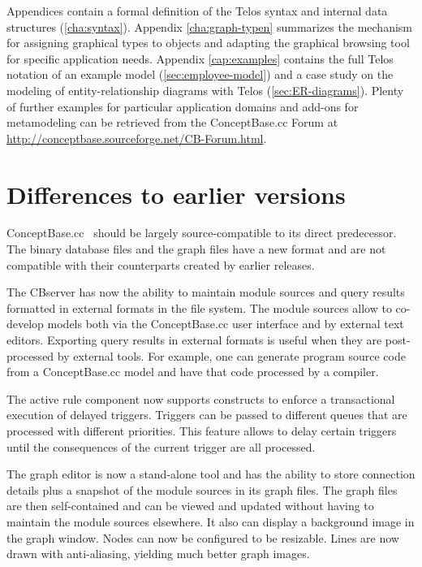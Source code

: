 Appendices contain a formal definition of the Telos syntax and internal data
structures (\ref{cha:syntax}). Appendix \ref{cha:graph-typen} summarizes
the mechanism for assigning graphical types to objects and adapting
the graphical browsing tool for specific application needs. Appendix
\ref{cap:examples} contains the full Telos notation of an example model
(\ref{sec:employee-model}) and a case study on the modeling of
entity-relationship diagrams with Telos (\ref{sec:ER-diagrams}).
Plenty of further examples for particular application domains and add-ons for
metamodeling can be retrieved from the ConceptBase.cc Forum at
\url{http://conceptbase.sourceforge.net/CB-Forum.html}. 

\section{Differences to earlier versions}
\label{sec:differences}

ConceptBase.cc \relnr\ should be largely source-compatible to its direct predecessor.
The binary database files and the graph files have a new format and
are not compatible with their counterparts created by earlier releases.

The CBserver has now the ability to maintain module sources and
query results formatted in external formats in the file system. 
The module sources allow to co-develop models both via the ConceptBase.cc
user interface and by external text editors. Exporting query results in
external formats is useful when they are post-processed by external
tools. For example, one can generate program source code from 
a ConceptBase.cc model and have that code processed by a compiler.

The active rule component now supports constructs to enforce a
transactional execution of delayed triggers. Triggers can be passed to different queues
that are processed with different priorities. This feature allows to
delay certain triggers until the consequences of the current trigger are
all processed.

The graph editor is now a stand-alone tool and has the ability to store connection details
plus a snapshot of the module sources in its graph files. The graph files
are then self-contained and can be viewed and updated without having
to maintain the module sources elsewhere. It also can display a background
image in the graph window. Nodes can now be configured to be resizable.
Lines are now drawn with anti-aliasing, yielding much better graph images.

